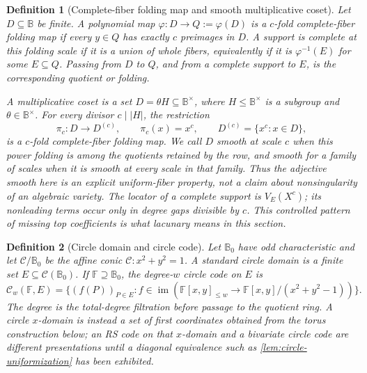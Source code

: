 \documentclass[12pt,a4paper]{amsart}
\numberwithin{equation}{section}
\newtheorem{definition}[definition]{Definition}
\theoremstyle{remark}
\newcommand{\F}{\mathbb F}
\newcommand{\B}{\mathbb B}
\newcommand{\abs}[1]{\lvert #1\rvert}
\begin{document}
\begin{definition}[Complete-fiber folding map and smooth multiplicative coset]
\label{def:structured-folding}
Let \(D\subseteq\B\) be finite.  A polynomial map
\(\varphi:D\to Q:=\varphi(D)\) is a \emph{\(c\)-fold
complete-fiber folding map} if every \(y\in Q\) has exactly \(c\)
preimages in \(D\).  A support is \emph{complete at this folding scale}
if it is a union of whole fibers, equivalently if it is
\(\varphi^{-1}(E)\) for some \(E\subseteq Q\).  Passing from \(D\) to
\(Q\), and from a complete support to \(E\), is the corresponding
\emph{quotient} or \emph{folding}.

A \emph{multiplicative coset} is a set \(D=\theta H\subseteq\B^\times\),
where \(H\le\B^\times\) is a subgroup and \(\theta\in\B^\times\).
For every divisor \(c\mid\abs H\), the restriction
\[
             \pi_c:D\longrightarrow D^{(c)},\qquad
             \pi_c(x)=x^c,\qquad
             D^{(c)}=\{x^c:x\in D\},
\]
is a \(c\)-fold complete-fiber folding map.  We call \(D\)
\emph{smooth at scale \(c\)} when this power folding is among the
quotients retained by the row, and \emph{smooth} for a family of scales
when it is smooth at every scale in that family.  Thus the adjective
\emph{smooth} here is an explicit uniform-fiber property, not a claim
about nonsingularity of an algebraic variety.  The locator of a complete
support is \(V_E(X^c)\); its nonleading terms occur only in degree gaps
divisible by \(c\).  This controlled pattern of missing top coefficients
is what \emph{lacunary} means in this section.
\end{definition}

\begin{definition}[Circle domain and circle code]
\label{def:circle-domain-code}
Let \(\B_0\) have odd characteristic and let
\(\mathcal C/\B_0\) be the affine conic
\(\mathcal C:x^2+y^2=1\).  A \emph{standard circle domain} is a finite
set \(E\subseteq\mathcal C(\B_0)\).  If \(\F\supseteq\B_0\), the
degree-\(w\) \emph{circle code} on \(E\) is
\[
 \mathcal C_w(\F,E)
 =\{(f(P))_{P\in E}:
      f\in\operatorname{im}(\F[x,y]_{\le w}
          \to\F[x,y]/(x^2+y^2-1))\}.
\]
The degree is the total-degree filtration before passage to the quotient
ring.  A \emph{circle \(x\)-domain} is instead a set of first
coordinates obtained from the torus construction below; an RS code on
that \(x\)-domain and a bivariate circle code are different presentations
until a diagonal equivalence such as
\cref{lem:circle-uniformization} has been exhibited.
\end{definition}
\end{document}
